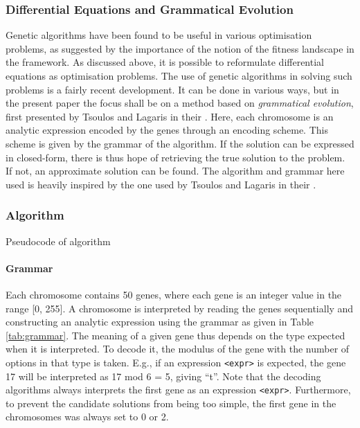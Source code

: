 \documentclass[multicolumn, 12pt]{extarticle}
\begin{document}
\subsubsection{Differential Equations and Grammatical Evolution}
Genetic algorithms have been found to be useful in various optimisation problems, as suggested by the importance of the notion of the fitness landscape in the framework. As discussed above, it is possible to reformulate differential equations as optimisation problems. The use of genetic algorithms in solving such problems is a fairly recent development. It can be done in various ways, but in the present paper the focus shall be on a method based on \textit{grammatical evolution}, first presented by Tsoulos and Lagaris in their  \cite{Lagaris}. Here, each chromosome is an analytic expression encoded by the genes through an encoding scheme. This scheme is given by the grammar of the algorithm. If the solution can be expressed in closed-form, there is thus hope of retrieving the true solution to the problem. If not, an approximate solution can be found. The algorithm and grammar here used is heavily inspired by the one used by Tsoulos and Lagaris in their  \cite{Lagaris}. 

\subsubsection{Algorithm}




Pseudocode of algorithm 

\paragraph{Grammar}
Each chromosome contains 50 genes, where each gene is an integer value in the range [0, 255]. A chromosome is interpreted by reading the genes sequentially and constructing an analytic expression using the grammar as given in Table \ref{tab:grammar}.  The meaning of a given gene thus depends on the type expected when it is interpreted. To decode it, the modulus of the gene with the number of options in that type is taken. E.g., if an expression \texttt{<expr>} is expected, the gene 17 will be interpreted as 17 mod 6 = 5, giving ``t''. Note that the decoding algorithms always interprets the first gene as an expression \texttt{<expr>}.  Furthermore, to prevent the candidate solutions from being too simple, the first gene in the chromosomes was always set to 0 or 2. 
\end{document}
